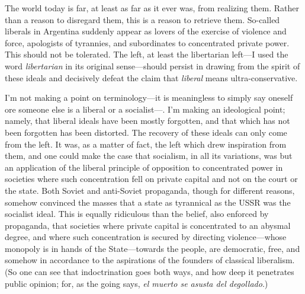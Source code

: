 \documentclass[a4paper]{article}
\begin{document}
The world today is far, at least as far as it ever was, from realizing them.
Rather than a reason to disregard them, this is a reason to retrieve them.
So-called liberals in Argentina suddenly appear as lovers of the exercise of
violence and force, apologists of tyrannies, and subordinates to concentrated
private power. This should not be tolerated. The left, at least the libertarian
left---I used the word \textit{libertarian} in its original sense---should
persist in drawing from the spirit of these ideals and decisively defeat the
claim that \textit{liberal} means ultra-conservative. 

I'm not making a point on terminology---it is meaningless to simply say oneself
ore someone else is a liberal or a socialist---. I'm making an ideological
point; namely, that liberal ideals have been mostly forgotten, and that which
has not been forgotten has been distorted. The recovery of these ideals can
only come from the left. It was, as a matter of fact, the left which drew
inspiration from them, and one could make the case that socialism, in all its
variations, was but an application of the liberal principle of opposition to
concentrated power in societies where such concentration fell on private
capital and not on the court or the state. Both Soviet and anti-Soviet
propaganda, though for different reasons, somehow convinced the masses that a
state as tyrannical as the USSR was the socialist ideal. This is equally
ridiculous than the belief, also enforced by propaganda, that societies where
private capital is concentrated to an abysmal degree, and where such
concentration is secured by directing violence---whose monopoly is in hands of
the State---towards the people, are democratic, free, and somehow in accordance
to the aspirations of the founders of classical liberalism. (So one can see
that indoctrination goes both ways, and how deep it penetrates public opinion;
for, as the going says, \textit{el muerto se asusta del degollado}.)
\end{document}
